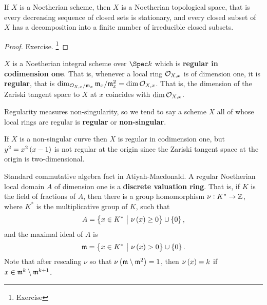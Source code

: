\begin{proposition}
If $ X $ is a Noetherian scheme, then $ X $ is a Noetherian topological space, that is every decreasing sequence of closed sets is stationary, and every closed subset of $ X $ has a decomposition into a finite number of irreducible closed subsets.
\end{proposition}

\begin{proof}
Exercise. \footnote{Exercise}
\end{proof}

\begin{assumption}
\label{ass}
$ X $ is a Noetherian integral scheme over $ \Spec k $ which is \textbf{regular in codimension one}. That is, whenever a local ring $ \mathcal{O}_{X, x} $ is of dimension one, it is \textbf{regular}, that is $ \dim_{\mathcal{O}_{X, x} / \mathfrak{m}_x} \mathfrak{m}_x / \mathfrak{m}_x^2 = \dim \mathcal{O}_{X, x} $. That is, the dimension of the Zariski tangent space to $ X $ at $ x $ coincides with $ \dim \mathcal{O}_{X, x} $.
\end{assumption}


\begin{remark*}
Regularity measures non-singularity, so we tend to say a scheme $ X $ all of whose local rings are regular is \textbf{regular} or \textbf{non-singular}.
\end{remark*}

\begin{example*}
If $ X $ is a non-singular curve then $ X $ is regular in codimension one, but $ y^2 = x^2\br{x - 1} $ is not regular at the origin since the Zariski tangent space at the origin is two-dimensional.
\end{example*}

\begin{remark*}
Standard commutative algebra fact in Atiyah-Macdonald. A regular Noetherian local domain $ A $ of dimension one is a \textbf{discrete valuation ring}. That is, if $ K $ is the field of fractions of $ A $, then there is a group homomorphism $ \nu : K^* \to \mathbb{Z} $, where $ K^* $ is the multiplicative group of $ K $, such that
$$ A = \cbr{x \in K^* \st \nu\br{x} \ge 0} \cup \cbr{0}, $$
and the maximal ideal of $ A $ is
$$ \mmm = \cbr{x \in K^* \st \nu\br{x} > 0} \cup \cbr{0}. $$
Note that after rescaling $ \nu $ so that $ \nu\br{\mmm \setminus \mmm^2} = 1 $, then $ \nu\br{x} = k $ if $ x \in \mathfrak{m}^k \setminus \mathfrak{m}^{k + 1} $.
\end{remark*}

